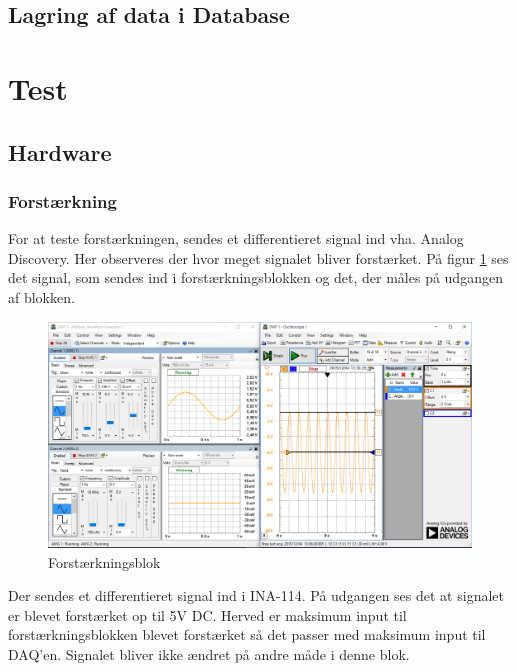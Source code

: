 \subsection{Lagring af data i Database}

\section{Test}
\subsection{Hardware}
\subsubsection{Forstærkning}
For at teste forstærkningen, sendes et differentieret signal ind vha. Analog Discovery. Her observeres der hvor meget signalet bliver forstærket. 
På figur \ref{fig:forstaerkning} ses det signal, som sendes ind i forstærkningsblokken og det, der måles på udgangen af blokken. 
\begin{figure}[H]
	\centering
	\includegraphics[width=1.0\textwidth]{Figurer/forst_blok}
	\caption{Forstærkningsblok}
	\label{fig:forstaerkning}
\end{figure}
Der sendes et differentieret signal ind i INA-114. På udgangen ses det at signalet er blevet forstærket op til 5V DC. Herved er maksimum input til forstærkningsblokken blevet forstærket så det passer med maksimum input til DAQ'en. Signalet bliver ikke ændret på andre måde i denne blok.

